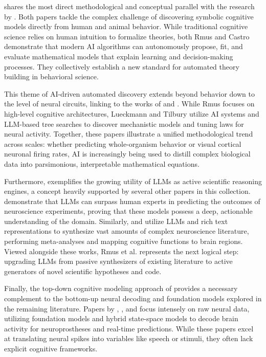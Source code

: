 \citet{rmus2025generating} shares the most direct methodological and conceptual parallel with the research by \citet{castro2025discovering}. Both papers tackle the complex challenge of discovering symbolic cognitive models directly from human and animal behavior. While traditional cognitive science relies on human intuition to formalize theories, both Rmus and Castro demonstrate that modern AI algorithms can autonomously propose, fit, and evaluate mathematical models that explain learning and decision-making processes. They collectively establish a new standard for automated theory building in behavioral science.

This theme of AI-driven automated discovery extends beyond behavior down to the level of neural circuits, linking \citet{rmus2025generating} to the works of \citet{lueckmann2026discovering} and \citet{tilbury2025ai}. While Rmus focuses on high-level cognitive architectures, Lueckmann and Tilbury utilize AI systems and LLM-based tree searches to discover mechanistic models and tuning laws for neural activity. Together, these papers illustrate a unified methodological trend across scales: whether predicting whole-organism behavior or visual cortical neuronal firing rates, AI is increasingly being used to distill complex biological data into parsimonious, interpretable mathematical equations.

Furthermore, \citet{rmus2025generating} exemplifies the growing utility of LLMs as active scientific reasoning engines, a concept heavily supported by several other papers in this collection. \citet{luo2025large} demonstrate that LLMs can surpass human experts in predicting the outcomes of neuroscience experiments, proving that these models possess a deep, actionable understanding of the domain. Similarly, \citet{luppi2025cognitive} and \citet{ghayem2026neurocontext} utilize LLMs and rich text representations to synthesize vast amounts of complex neuroscience literature, performing meta-analyses and mapping cognitive functions to brain regions. Viewed alongside these works, Rmus et al. represents the next logical step: upgrading LLMs from passive synthesizers of existing literature to active generators of novel scientific hypotheses and code.

Finally, the top-down cognitive modeling approach of \citet{rmus2025generating} provides a necessary complement to the bottom-up neural decoding and foundation models explored in the remaining literature. Papers by \citet{wang2025foundation}, \citet{ryoo2025generalizable}, and \citet{wairagkar2025instantaneous} focus intensely on raw neural data, utilizing foundation models and hybrid state-space models to decode brain activity for neuroprostheses and real-time predictions. While these papers excel at translating neural spikes into variables like speech or stimuli, they often lack explicit cognitive frameworks.

\newpage



